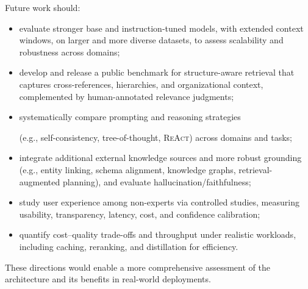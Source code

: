 Future work should:
\begin{itemize}
	\item evaluate stronger base and instruction-tuned models, with extended context windows, on larger and more diverse datasets, to assess scalability and robustness across domains;
	\item develop and release a public benchmark for structure-aware retrieval that captures cross-references, hierarchies, and organizational context, complemented by human-annotated relevance judgments;
	\item systematically compare prompting and reasoning strategies 
	
	(e.g., self-consistency, tree-of-thought, \textsc{ReAct}) across domains and tasks;
	\item integrate additional external knowledge sources and more robust grounding (e.g., entity linking, schema alignment, knowledge graphs, retrieval-augmented planning), and evaluate hallucination/faithfulness;
	\item study user experience among non-experts via controlled studies, measuring usability, transparency, latency, cost, and confidence calibration;
	\item quantify cost–quality trade-offs and throughput under realistic workloads, including caching, reranking, and distillation for efficiency.
\end{itemize}

These directions would enable a more comprehensive assessment of the architecture and its benefits in real-world deployments.



